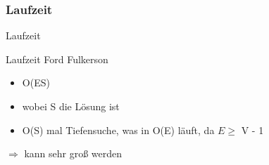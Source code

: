 \subsubsection{Laufzeit}
\begin{frame}{Laufzeit}
  \begin{block}{Laufzeit Ford Fulkerson}
      \begin{itemize}
        \item O(ES)
        \pause
        \item wobei S die Lösung ist
        \pause
        \item O(S) mal Tiefensuche, was in O(E) läuft, da $E \geq$ V - 1
      \end{itemize}
      \pause
      $\Rightarrow$ kann sehr groß werden
  \end{block}
\end{frame}
